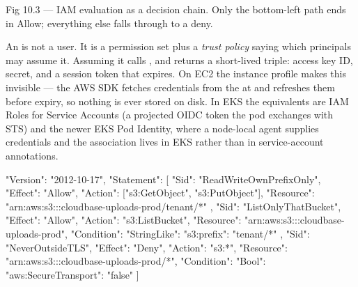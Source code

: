 \begin{wbfigure}{Fig 10.3 — IAM evaluation as a decision chain. Only the bottom-left path ends in Allow; everything else falls through to a deny.}
\end{wbfigure}

 An  is not a user. It is a permission set plus a \emph{trust policy} saying which principals may assume it. Assuming it calls , and  returns a short-lived triple: access key ID, secret, and a session token that expires. On EC2 the instance profile makes this invisible --- the AWS SDK fetches credentials from the  at  and refreshes them before expiry, so nothing is ever stored on disk. In EKS the equivalents are IAM Roles for Service Accounts (a projected OIDC token the pod exchanges with STS) and the newer EKS Pod Identity, where a node-local agent supplies credentials and the association lives in EKS rather than in service-account annotations.

\begin{propsbox}
{
  "Version": "2012-10-17",
  "Statement": [
    {
      "Sid": "ReadWriteOwnPrefixOnly",
      "Effect": "Allow",
      "Action": ["s3:GetObject", "s3:PutObject"],
      "Resource": "arn:aws:s3:::cloudbase-uploads-prod/tenant/*"
    },
    {
      "Sid": "ListOnlyThatBucket",
      "Effect": "Allow",
      "Action": "s3:ListBucket",
      "Resource": "arn:aws:s3:::cloudbase-uploads-prod",
      "Condition": { "StringLike": { "s3:prefix": "tenant/*" } }
    },
    {
      "Sid": "NeverOutsideTLS",
      "Effect": "Deny",
      "Action": "s3:*",
      "Resource": "arn:aws:s3:::cloudbase-uploads-prod/*",
      "Condition": { "Bool": { "aws:SecureTransport": "false" } }
    }
  ]
}
\end{propsbox}

